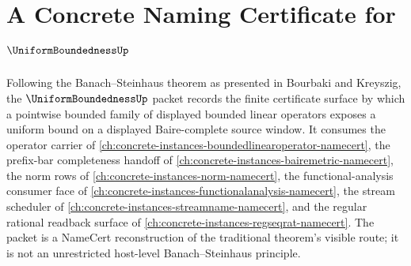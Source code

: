 \chapter{A Concrete Naming Certificate for $\UniformBoundednessUp$}
\label{ch:concrete-instances-uniformboundedness-namecert}

Following the Banach--Steinhaus theorem as presented in Bourbaki and Kreyszig, the $\UniformBoundednessUp$ packet records the finite certificate surface by which a pointwise bounded family of displayed bounded linear operators exposes a uniform bound on a displayed Baire-complete source window. It consumes the operator carrier of \autoref{ch:concrete-instances-boundedlinearoperator-namecert}, the prefix-bar completeness handoff of \autoref{ch:concrete-instances-bairemetric-namecert}, the norm rows of \autoref{ch:concrete-instances-norm-namecert}, the functional-analysis consumer face of \autoref{ch:concrete-instances-functionalanalysis-namecert}, the stream scheduler of \autoref{ch:concrete-instances-streamname-namecert}, and the regular rational readback surface of \autoref{ch:concrete-instances-regseqrat-namecert}. The packet is a NameCert reconstruction of the traditional theorem's visible route; it is not an unrestricted host-level Banach--Steinhaus principle.

